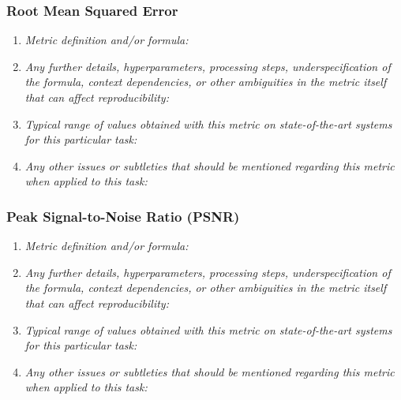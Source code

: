 \documentclass[a4paper,11pt]{article}
\begin{document}
        \subsubsection{Root Mean Squared Error}
            \begin{enumerate}[label=\alph*.]
                \item \textit{Metric definition and/or formula:}
                \bigskip
                \item \textit{Any further details, hyperparameters, processing steps, underspecification of the formula, context dependencies, or other ambiguities in the metric itself that can affect reproducibility:}
                \bigskip
                \item \textit{Typical range of values obtained with this metric on state-of-the-art systems for this particular task:}
                \bigskip
                \item \textit{Any other issues or subtleties that should be mentioned regarding this metric when applied to this task:}
                \bigskip
            \end{enumerate}
        \subsubsection{Peak Signal-to-Noise Ratio (PSNR)}
            \begin{enumerate}[label=\alph*.]
                \item \textit{Metric definition and/or formula:}
                \bigskip
                \item \textit{Any further details, hyperparameters, processing steps, underspecification of the formula, context dependencies, or other ambiguities in the metric itself that can affect reproducibility:}
                \bigskip
                \item \textit{Typical range of values obtained with this metric on state-of-the-art systems for this particular task:}
                \bigskip
                \item \textit{Any other issues or subtleties that should be mentioned regarding this metric when applied to this task:}
                \bigskip
            \end{enumerate}
\end{document}
